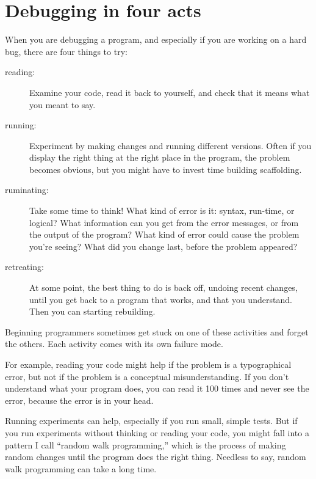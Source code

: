 \documentclass[
]{book}
\numberwithin{Answer}{chapter}
\numberwithin{Exercise}{chapter}
\begin{document}
\section{Debugging in four acts}

When you are debugging a program, and especially if you are working on a hard bug, there are four things to try:

\begin{description}

\item[reading:] Examine your code, read it back to yourself, and
check that it means what you meant to say.

\item[running:] Experiment by making changes and running different
versions.  Often if you display the right thing at the right place
in the program, the problem becomes obvious, but you might have to invest time building scaffolding.

\item[ruminating:] Take some time to think!  What kind of error
is it: syntax, run-time, or logical?  What information can you get from
the error messages, or from the output of the program?  What kind of
error could cause the problem you're seeing?  What did you change
last, before the problem appeared?

\item[retreating:] At some point, the best thing to do is back
off, undoing recent changes, until you get back to a program that
works, and that you understand.  Then you can starting rebuilding.

\end{description}

Beginning programmers sometimes get stuck on one of these activities
and forget the others.  Each activity comes with its own failure
mode.

For example, reading your code might help if the problem is a
typographical error, but not if the problem is a conceptual
misunderstanding.  If you don't understand what your program does, you
can read it 100 times and never see the error, because the error is in
your head.

Running experiments can help, especially if you run small, simple
tests.  But if you run experiments without thinking or reading your
code, you might fall into a pattern I call ``random walk programming,''
which is the process of making random changes until the program
does the right thing.  Needless to say, random walk programming
can take a long time.
\end{document}
